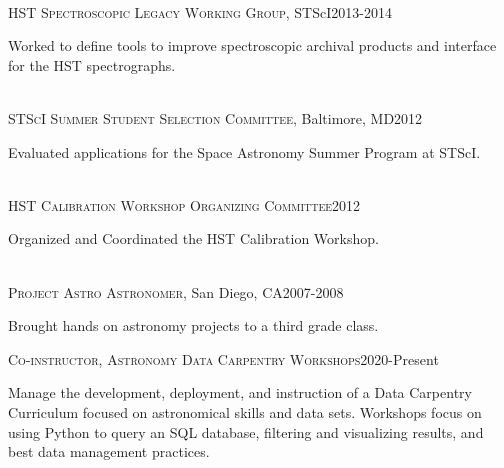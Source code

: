 \documentclass[10pt]{cv}
\begin{document}
\begin{llist}
\begin{minipage}[l]{0.7\textwidth}
\end{minipage}\vspace{0.15cm}
\\
\textsc{HST Spectroscopic Legacy Working Group}, STScI\hfill2013-2014\\
\begin{minipage}[l]{0.7\textwidth}\vspace{0.15cm}
Worked to define tools to improve spectroscopic archival products and interface for the HST spectrographs.\\
\end{minipage}\vspace{0.15cm}
\\
\textsc{STScI Summer Student Selection Committee}, Baltimore, MD\hfill2012\\
\begin{minipage}[l]{0.7\textwidth}\vspace{0.15cm}
Evaluated applications for the Space Astronomy Summer Program at STScI.\\
\end{minipage}\vspace{0.15cm}
\\
\textsc{HST Calibration Workshop Organizing Committee}\hfill 2012\\
\begin{minipage}[l]{0.7\textwidth}\vspace{0.15cm}
Organized and Coordinated the HST Calibration Workshop.\\
\end{minipage}\vspace{0.15cm}
\\
\textsc{Project Astro Astronomer}, San Diego, CA\hfill 2007-2008\\
\begin{minipage}[l]{0.7\textwidth}\vspace{0.15cm}
Brought hands on astronomy projects to a third grade class.\\
\end{minipage}\vspace{0.15cm}
\vspace{-0.1in}   
\textsc{Co-instructor, Astronomy Data Carpentry Workshops}\hfill 2020-Present\\
\begin{minipage}[l]{0.7\textwidth}\vspace{0.15cm}
Manage the development, deployment, and instruction of a Data Carpentry Curriculum focused on astronomical skills and data sets. Workshops focus on using Python to query an SQL database, filtering and visualizing results, and best data management practices.  \\
\end{minipage}\vspace{0.15cm}


\end{llist}
\end{document}
